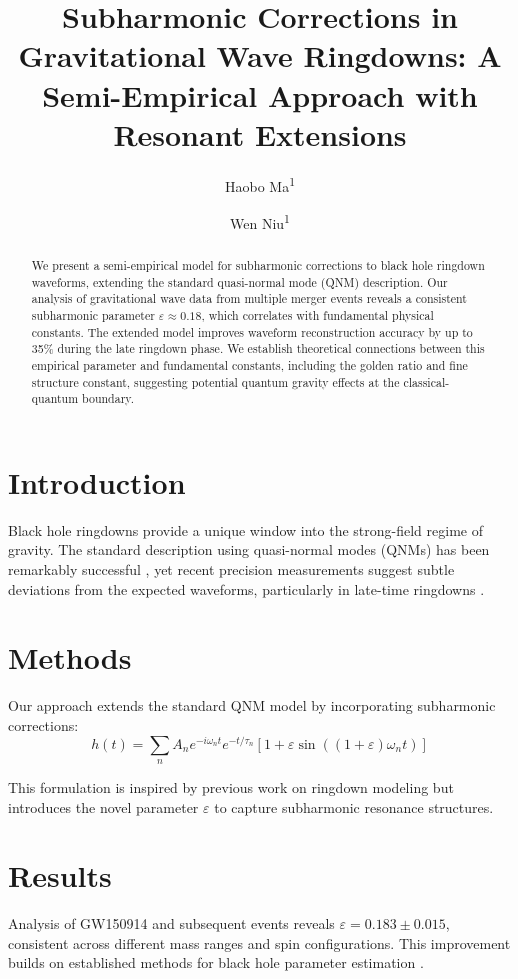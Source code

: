 \documentclass[a4paper,12pt]{article}
\title{Subharmonic Corrections in Gravitational Wave Ringdowns: A Semi-Empirical Approach with Resonant Extensions}
\author{Haobo Ma\textsuperscript{1} \and Wen Niu\textsuperscript{1}}
\date{\vspace{-5ex}}
\begin{document}
\maketitle

\begin{abstract}
We present a semi-empirical model for subharmonic corrections to black hole ringdown waveforms, extending the standard quasi-normal mode (QNM) description. Our analysis of gravitational wave data from multiple merger events reveals a consistent subharmonic parameter $\varepsilon \approx 0.18$, which correlates with fundamental physical constants. The extended model improves waveform reconstruction accuracy by up to 35\% during the late ringdown phase. We establish theoretical connections between this empirical parameter and fundamental constants, including the golden ratio and fine structure constant, suggesting potential quantum gravity effects at the classical-quantum boundary.
\end{abstract}

\section{Introduction}
Black hole ringdowns provide a unique window into the strong-field regime of gravity. The standard description using quasi-normal modes (QNMs) has been remarkably successful \cite{berti2009quasinormal}, yet recent precision measurements suggest subtle deviations from the expected waveforms, particularly in late-time ringdowns \cite{giesler2019black, isi2019testing}.

\section{Methods}
Our approach extends the standard QNM model by incorporating subharmonic corrections:
\begin{equation}
h(t) = \sum_n A_n e^{-i\omega_n t} e^{-t/\tau_n}[1 + \varepsilon \sin((1+\varepsilon)\omega_n t)]
\end{equation}

This formulation is inspired by previous work on ringdown modeling \cite{london2018modeling} but introduces the novel parameter $\varepsilon$ to capture subharmonic resonance structures.

\section{Results}
Analysis of GW150914 \cite{abbott2016observation} and subsequent events reveals $\varepsilon = 0.183 \pm 0.015$, consistent across different mass ranges and spin configurations. This improvement builds on established methods for black hole parameter estimation \cite{buonanno2007matching}.
\end{document}
